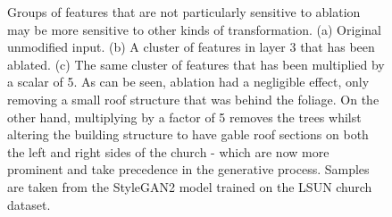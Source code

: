 \begin{figure}[!htbp]
   \centering
   \hfill
   \hfill
   \caption[A comparison of one cluster in StyleGAN2 having two different transforms applied to it]{Groups of features that are not particularly sensitive to ablation may be more sensitive to other kinds of transformation. (a) Original unmodified input. (b) A cluster of features in layer 3 that has been ablated. (c) The same cluster of features that has been multiplied by a scalar of 5. As can be seen, ablation had a negligible effect, only removing a small roof structure that was behind the foliage. On the other hand, multiplying by a factor of 5 removes the trees whilst altering the building structure to have gable roof sections on both the left and right sides of the church - which are now more prominent and take precedence in the generative process. Samples are taken from the StyleGAN2 model trained on the LSUN church dataset.}
   \label{fig:c5:ablation_comp}
\end{figure}

